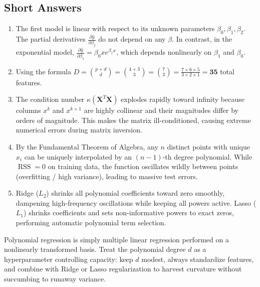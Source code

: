 \documentclass[11pt,a4paper]{article}
\numberwithin{equation}{section}
\newcommand{\RSS}{\operatorname{RSS}}
\newcommand{\X}{\mathbf{X}}
\begin{document}
\subsection{Short Answers}
\begin{enumerate}
  \item The first model is linear with respect to its unknown parameters $\beta_0, \beta_1, \beta_2$. The partial derivatives $\frac{\partial \hat{y}}{\partial \beta_j}$ do not depend on any $\beta$. In contrast, in the exponential model, $\frac{\partial \hat{y}}{\partial \beta_1} = \beta_0 x e^{\beta_1 x}$, which depends nonlinearly on $\beta_1$ and $\beta_0$.
  \item Using the formula $D = \binom{p+d}{d} = \binom{4+3}{3} = \binom{7}{3} = \frac{7 \times 6 \times 5}{3 \times 2 \times 1} = \mathbf{35}$ total features.
  \item The condition number $\kappa(\X^T\X)$ explodes rapidly toward infinity because columns $x^k$ and $x^{k+1}$ are highly collinear and their magnitudes differ by orders of magnitude. This makes the matrix ill-conditioned, causing extreme numerical errors during matrix inversion.
  \item By the Fundamental Theorem of Algebra, any $n$ distinct points with unique $x_i$ can be uniquely interpolated by an $(n-1)$-th degree polynomial. While $\RSS = 0$ on training data, the function oscillates wildly between points (overfitting / high variance), leading to massive test errors.
  \item Ridge ($L_2$) shrinks all polynomial coefficients toward zero smoothly, dampening high-frequency oscillations while keeping all powers active. Lasso ($L_1$) shrinks coefficients and sets non-informative powers to exact zeros, performing automatic polynomial term selection.
\end{enumerate}

\begin{keyidea}[title=Final Mental Model]
Polynomial regression is simply multiple linear regression performed on a nonlinearly transformed basis. Treat the polynomial degree $d$ as a hyperparameter controlling capacity: keep $d$ modest, always standardize features, and combine with Ridge or Lasso regularization to harvest curvature without succumbing to runaway variance.
\end{keyidea}
\end{document}
